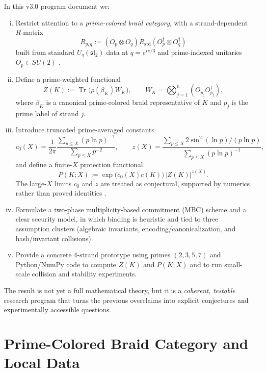\documentclass[11pt]{article}
\begin{document}
In this v3.0 program document we:

\begin{enumerate}[(i)]
  \item Restrict attention to a \emph{prime-colored braid category}, with a strand-dependent $R$-matrix
  \[
    R_{p,q} := (O_p \otimes O_q) R_{\mathrm{std}} (O_p^\dagger \otimes O_q^\dagger)
  \]
  built from standard $U_q(\mathfrak{sl}_2)$ data at $q = e^{i\pi/3}$ and prime-indexed unitaries $O_p \in SU(2)$ \cite[Sec.~2.1--2.3]{MTv21}.

  \item Define a prime-weighted functional
  \[
    Z(K) := \operatorname{Tr}\big(\rho(\beta_K) W_K\big), \qquad
    W_K = \bigotimes_{j=1}^n (O_{p_j} O_{p_j}^\dagger),
  \]
  where $\beta_K$ is a canonical prime-colored braid representative of $K$ and $p_j$ is the prime label of strand $j$.

  \item Introduce truncated prime-averaged constants
  \[
    c_0(X) = \frac{1}{2\pi} \frac{\sum_{p\le X} (p\ln p)^{-1}}{\sum_{p\le X} p^{-2}}, \qquad
    z(X) = \frac{\sum_{p\le X} 2\sin^2(\ln p)/(p\ln p)}{\sum_{p\le X} (p\ln p)^{-1}},
  \]
  and define a finite-$X$ protection functional
  \[
    P(K;X) := \exp\big(c_0(X) c(K)\big)\, |Z(K)|^{z(X)}.
  \]
  The large-$X$ limits $c_0$ and $z$ are treated as conjectural, supported by numerics rather than proved identities \cite[Sec.~3--4]{MTv21}.

  \item Formulate a two-phase multiplicity-based commitment (MBC) scheme and a clear security model, in which binding is heuristic and tied to three assumption clusters (algebraic invariants, encoding/canonicalization, and hash/invariant collisions).

  \item Provide a concrete 4-strand prototype using primes $(2,3,5,7)$ and Python/NumPy code to compute $Z(K)$ and $P(K;X)$ and to run small-scale collision and stability experiments.
\end{enumerate}

The result is not yet a full mathematical theory, but it is a \emph{coherent, testable} research program that turns the previous overclaims into explicit conjectures and experimentally accessible questions.

\section{Prime-Colored Braid Category and Local Data}
\end{document}
